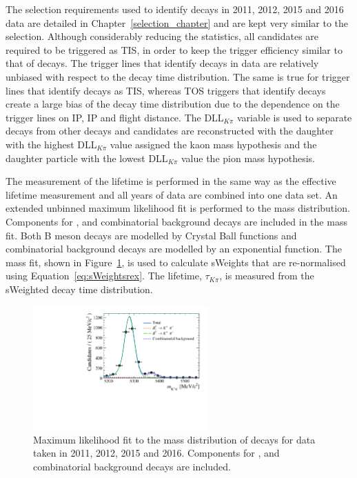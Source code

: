 The selection requirements used to identify \bdkpi decays in 2011, 2012, 2015 and 2016 data are detailed in Chapter~\ref{selection_chapter} and are kept very similar to the \bsmumu selection. Although considerably reducing the statistics, all candidates are required to be triggered as TIS, in order to keep the \bhh trigger efficiency similar to that of \bsmumu decays. %
The trigger lines that identify \bsmumu decays in data are relatively unbiased with respect to the \bs decay time distribution. The same is true for trigger lines that identify \bhh decays as TIS, whereas TOS triggers that identify \bhh decays create a large bias of the decay time distribution due to the dependence on the trigger lines on \bs IP, IP \chisqd and flight distance.
The DLL$_{K\pi}$ variable is used to separate \bdkpi decays from other \bhh decays and candidates are reconstructed with the daughter with the highest DLL$_{K\pi}$ value assigned the kaon mass hypothesis and the daughter particle with the lowest DLL$_{K\pi}$ value the pion mass hypothesis.

The measurement of the \bdki lifetime is performed in the same way as the \bsmumu effective lifetime measurement and all years of data are combined into one data set. An extended unbinned maximum likelihood fit is performed to the \bdkpi mass distribution. Components for \bdkpi, \bskpi and combinatorial background decays are included in the mass fit. Both B meson decays are modelled by Crystal Ball functions and combinatorial background decays are modelled by an exponential function. The mass fit, shown in Figure~\ref{fig:bdkpimassfit}, is used to calculate sWeights that are re-normalised using Equation~\ref{eq:sWeightsrex}. The lifetime, $\tau_{K\pi}$, is  measured from the sWeighted decay time distribution. 

\begin{figure}[htbp]
\centering
  \includegraphics[width=0.6\textwidth]{./Figs/LifetimeSystematics/Bd2KPi_mass_fit.pdf}
\caption{Maximum likelihood fit to the mass distribution of \bdkpi decays for data taken in 2011, 2012, 2015 and 2016. Components for \bdkpi, \bskpi and combinatorial background decays are included. }
\label{fig:bdkpimassfit}
\end{figure}


